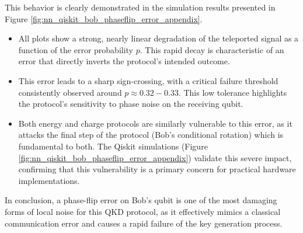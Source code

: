 This behavior is clearly demonstrated in the simulation results presented in Figure \ref{fig:nn_qiskit_bob_phaseflip_error_appendix}.
\begin{itemize}
    \item All plots show a strong, nearly linear degradation of the teleported signal as a function of the error probability $p$. This rapid decay is characteristic of an error that directly inverts the protocol's intended outcome.
    
    \item This error leads to a sharp sign-crossing, with a critical failure threshold consistently observed around $p \approx 0.32-0.33$. This low tolerance highlights the protocol's sensitivity to phase noise on the receiving qubit.
    
    \item Both energy and charge protocols are similarly vulnerable to this error, as it attacks the final step of the protocol (Bob's conditional rotation) which is fundamental to both. The Qiskit simulations (Figure \ref{fig:nn_qiskit_bob_phaseflip_error_appendix}) validate this severe impact, confirming that this vulnerability is a primary concern for practical hardware implementations.
\end{itemize}
In conclusion, a phase-flip error on Bob's qubit is one of the most damaging forms of local noise for this QKD protocol, as it effectively mimics a classical communication error and causes a rapid failure of the key generation process.


